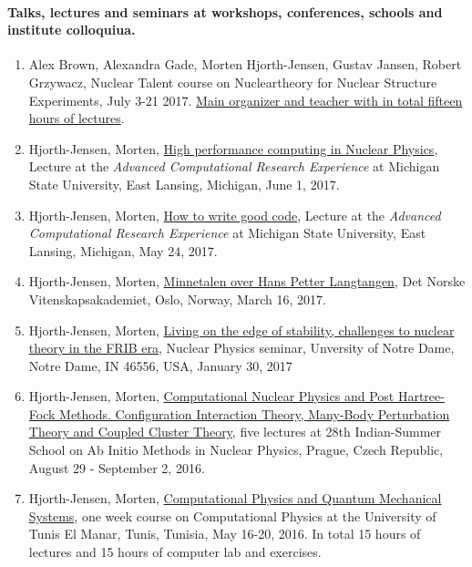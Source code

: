 \documentclass[a4wide,10pt]{article}
\begin{document}
\paragraph{Talks, lectures and seminars at workshops, conferences, schools  and institute colloquiua.}
\begin{enumerate}
\item Alex Brown, Alexandra Gade, Morten Hjorth-Jensen, Gustav Jansen, Robert Grzywacz, Nuclear Talent course on Nucleartheory for Nuclear Structure Experiments, July 3-21 2017. \href{{https://github.com/NuclearTalent/NuclearStructure}}{Main organizer and teacher with in total fifteen hours of lectures}. 

\item Hjorth-Jensen, Morten, \href{{https://icer-acres.msu.edu/summer-2017/schedule/}}{High performance computing in Nuclear Physics}, Lecture at the \emph{Advanced Computational Research Experience} at Michigan State University, East Lansing, Michigan, June 1, 2017.

\item Hjorth-Jensen, Morten, \href{{https://icer-acres.msu.edu/summer-2017/schedule/}}{How to write good code}, Lecture at the \emph{Advanced Computational Research Experience} at Michigan State University, East Lansing, Michigan, May 24, 2017.

\item Hjorth-Jensen, Morten, \href{{http://www.dnva.no/c26754/kalender/index.html?year=2017&month=3&day=16}}{Minnetalen over Hans Petter Langtangen}, Det Norske Vitenskapsakademiet, Oslo, Norway, March 16, 2017.

\item Hjorth-Jensen, Morten, \href{{https://science.nd.edu/events/2017/01/30/nuclear-physics-seminar-prof-morten-hjorth-jensen/}}{Living on the edge of stability, challenges to nuclear theory in the FRIB era}, Nuclear Physics seminar, Unversity of Notre Dame, Notre Dame, IN 46556, USA, January 30, 2017 

\item Hjorth-Jensen, Morten, \href{{http://rafael.ujf.cas.cz/school}}{Computational Nuclear Physics and Post Hartree-Fock Methods. Configuration Interaction Theory, Many-Body Perturbation Theory and Coupled Cluster Theory}, five lectures at 28th Indian-Summer School on Ab Initio Methods in Nuclear Physics, Prague, Czech Republic, August 29 - September 2, 2016.

\item Hjorth-Jensen, Morten, \href{{http://compphysics.github.io/CompPhysUTunis/doc/web/course.html}}{Computational Physics and Quantum Mechanical Systems}, one week course on Computational Physics at the University of Tunis El Manar, Tunis, Tunisia, May 16-20, 2016. In total 15 hours of lectures and 15 hours of computer lab and exercises. 


\end{enumerate}
\end{document}
